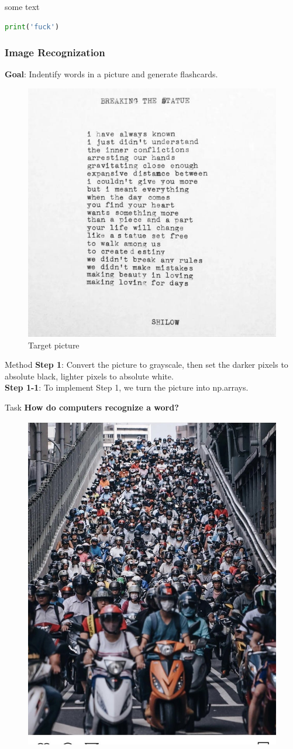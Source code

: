 \documentclass{beamer}
\begin{document}
\frame{\titlepage} 

\begin{frame}[fragile]
some text
\begin{lstlisting}[language=python]
print('fuck')
\end{lstlisting}
\end{frame} 

\begin{frame}
	\frametitle{Image Recognization}
	\textbf{Goal}: Indentify words in a picture and generate flashcards.
	\begin{figure}[h]
		\centering
		\includegraphics[width=0.55\linewidth]{./img1.jpg}
		\caption{Target picture}
	\end{figure}
\end{frame}

\begin{frame}{Method}
		\textbf{Step 1}: Convert the picture to grayscale, then set the darker pixels to absolute black, lighter pixels to absolute white.\\
		\textbf{Step 1-1}: To implement Step 1, we turn the picture into np.arrays.
\end{frame}

\begin{frame}{Task}
		\textbf{How do computers recognize a word?}
		\begin{figure}[h]
			\centering
			\includegraphics[width=0.55\linewidth]{./motor.jpg}
		\end{figure}
\end{frame}
\end{document}
